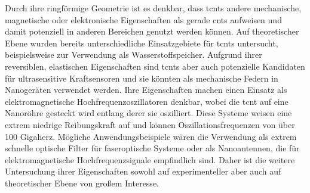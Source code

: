 Durch ihre ringförmige Geometrie ist es denkbar, dass \acp{tcnt} andere mechanische, magnetische oder elektronische Eigenschaften als gerade \acp{cnt} aufweisen und damit potenziell in anderen Bereichen genutzt werden können.\supercite{liu2014curved} Auf theoretischer Ebene wurden bereits unterschiedliche Einsatzgebiete für \acp{tcnt} untersucht, beispielsweise zur Verwendung als Wasserstoffspeicher\supercite{castillo2010hydrogen,cruz2010hydrogen}. Aufgrund ihrer reversiblen, elastischen Eigenschaften sind \acp{tcnt} aber auch potenzielle Kandidaten für ultrasensitive Kraftsensoren und sie könnten als mechanische Federn in Nanogeräten verwendet werden.\supercite{zheng2010elastic,chen2011controlling} Ihre Eigenschaften machen einen Einsatz als elektromagnetische Hochfrequenzoszillatoren denkbar, wobei die \ac{tcnt} auf eine Nanoröhre gesteckt wird entlang derer sie oszilliert. \supercite{hilder2007oscillating,ansari2017oscillation} Diese Systeme weisen eine extrem niedrige Reibungskraft auf\supercite{cumings2000low} und können Oszillationsfrequenzen von über 100 Gigaherz.\supercite{liu2014curved} Mögliche Anwendungsbeispiele wären die Verwendung als extrem schnelle optische Filter für faseroptische Systeme oder als Nanoantennen, die für elektromagnetische Hochfrequenzsignale empfindlich sind.\supercite{hilder2007oscillating} Daher ist die weitere Untersuchung ihrer Eigenschaften sowohl auf experimenteller aber auch auf theoretischer Ebene von großem Interesse.

